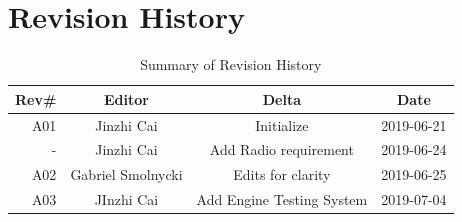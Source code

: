 \documentclass[12pt,article]{memoir}
\begin{document}
\chapter{Revision History}
\begin{table}[H]
	\centering
	\begin{tabu}{r || c | c | c }
		Rev\# & Editor & Delta & Date\\ \hline
		A01 & Jinzhi Cai & Initialize  & 2019-06-21 \\
		-	& Jinzhi Cai & Add Radio requirement & 2019-06-24 \\ \hline
		A02 & Gabriel Smolnycki & Edits for clarity & 2019-06-25\\ \hline
		A03 & JInzhi Cai & Add Engine Testing System & 2019-07-04\\ \hline
	\end{tabu}
	\caption{Summary of Revision History}
	\label{tab:edatools}
\end{table}

\end{document}
